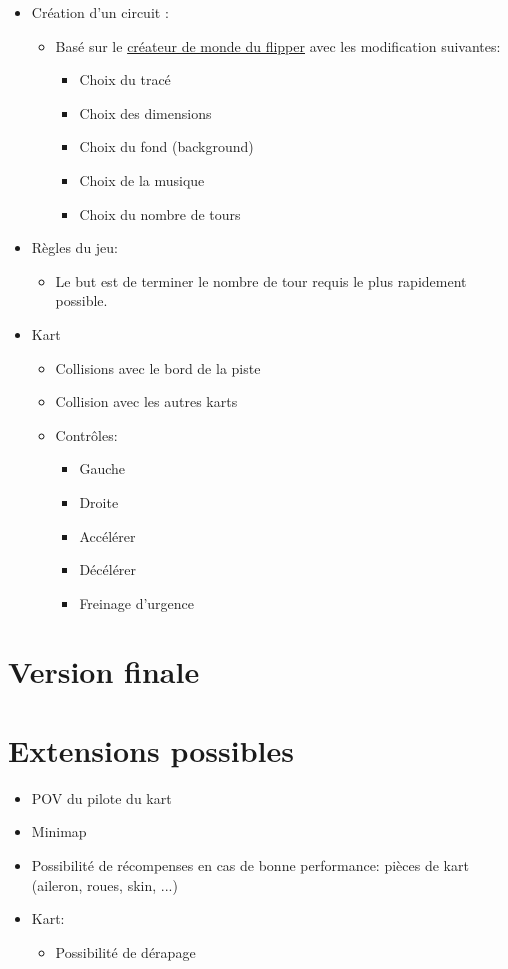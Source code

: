 \documentclass{article}
\begin{document}
\begin{itemize}
    \item Création d'un circuit :
          \begin{itemize}
              \item Basé sur le \href{https://lj44.ch/creator/flipper}{créateur de monde du flipper} avec les modification suivantes: \begin{itemize}
                        \item Choix du tracé
                        \item Choix des dimensions
                        \item Choix du fond (background)
                        \item Choix de la musique
                        \item Choix du nombre de tours
                    \end{itemize}
          \end{itemize}
    \item Règles du jeu: \begin{itemize}
        \item Le but est de terminer le nombre de tour requis le plus rapidement possible.
    \end{itemize}
    \item Kart \begin{itemize}
        \item Collisions avec le bord de la piste
        \item Collision avec les autres karts
        \item Contrôles: \begin{itemize}
            \item Gauche
            \item Droite
            \item Accélérer
            \item Décélérer
            \item Freinage d'urgence
        \end{itemize}
    \end{itemize}
\end{itemize}

\section{Version finale}

\section{Extensions possibles}
\begin{itemize}
    \item POV du pilote du kart
    \item Minimap
    \item Possibilité de récompenses en cas de bonne performance: pièces de kart (aileron, roues, skin, ...)
    \item Kart: \begin{itemize}
        \item Possibilité de dérapage
    \end{itemize}
\end{itemize}
\end{document}
